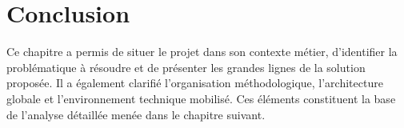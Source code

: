 \section{Conclusion}
Ce chapitre a permis de situer le projet dans son contexte métier, d'identifier la problématique à résoudre et de présenter les grandes lignes de la solution proposée. Il a également clarifié l'organisation méthodologique, l'architecture globale et l'environnement technique mobilisé. Ces éléments constituent la base de l'analyse détaillée menée dans le chapitre suivant.
